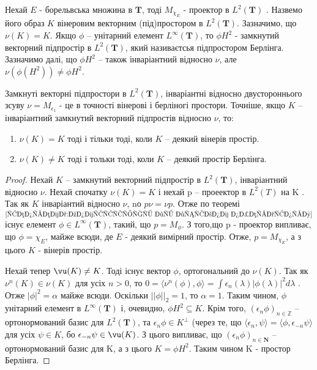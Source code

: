 Нехай $E$ - борельвська множина в $\textbf{T}$, тоді $M_{\chi_E}$ - проектор в $ L^2(\textbf{T})$ .
Назвемо його образ $K$ вінеровим векторним (під)простором в $ L^2(\textbf{T}) $.
Зазначимо, що $\nu(K) = K$.
Якщо $\phi$ -- унітарний елемент $L^\infty(\textbf{T})$, то $\phi H^2$ - замкнутий векторний
підпростір в $L^2(\mathbf{T})$, який називаєтсья підпростором Берлінга.
Зазначимо далі, що $\phi H^2$ -- також інваріантний відносно $\nu$, але $\nu(\phi(H^2)) \neq \phi H^2$.

\begin{theorem}
    \label{теорема:інваріантні відносно зсуву підпростори}
    Замкнуті векторні підпростори в $ L^2(\textbf{T}) $, інваріантні відносно двустороннього зсуву
    $\nu = M_{\epsilon_1}$  - це в точності вінерові і берліногі простори.
    Точніше, якщо $K$ -- інваріантний замкнутий векторний підпростів відносно $\nu$, то:
    \begin{enumerate}
        \item $\nu(K) = K$ тоді і тільки тоді, коли $K$ -- деякий вінерів простір.
        \item $\nu(K) \neq K$ тоді і тольки тоді, коли $K$ -- деякий простір Берлінга.
    \end{enumerate}
    \begin{proof}
        Нехай $K$ -- замкнутий векторний підпростір в $ L^2(\textbf{T}) $,
        інваріантний відносно $\nu$.
        Нехай спочатку $\nu(K) = K$ і нехай p -- проеектор в $L^2(T)$ на K .
        Так як $K$ інваріантий відносно $\nu$, nо $p\nu =\nu p$.
        Отже по теоремі~$\ref{теорема:комутуючі зі зсувом оператори}$ існує елемент
        $\phi \in L^\infty(\mathbf{T})$, такий, що $p = M_\phi$.
        З того,що p - проектор випливає, що $\phi = \chi_E$, майже всюди,
        де $E$ - деякий вимірний простір.
        Отже, $p = M_{\chi_E}$, а з цього $K$ - вінерів простір.

        Нехай тепер $\vu(K) \neq K$.
        Тоді існує вектор $\phi$, ортогональний до $\nu(K)$.
        Так як $\nu^n(K) \in \nu(K)$ для усіх $n > 0$, то $0 = \langle \nu^n(\phi), \phi \rangle = \int \epsilon_n(\lambda)|\phi(\lambda)|^2 d \lambda$ .
        Отже $|\phi|^2 = \alpha$ майже всюди.
        Оскільки $||\phi||_2 = 1$, то $\alpha = 1$.
        Таким чином, $\phi$ унітарний елемент в $L^\infty(\mathbf{T})$ і, очевидно, $\phi H^2 \subseteq K$.
        Крім того, $(\epsilon_n \phi)_{n \in \mathbb{Z}}$ -- ортонормований базис для $L^2(\mathbf{T})$,
        та $\epsilon_n \phi \in K^\bot$ (через те, що $\langle \epsilon_n, \psi \rangle = \langle \phi, \epsilon_{-n} \psi \rangle$
        для усіх $\psi \in K$, бо $\epsilon_{-n}\psi \in \vu(K)$.
        З цього випливає, що $(\epsilon_n \phi)_{n \in \mathbf{N}}$ -- ортонормований базис для K,
        а з цього $K = \phi H^2$.
        Таким чином K - простор Берлінга.
    \end{proof}
\end{theorem}

